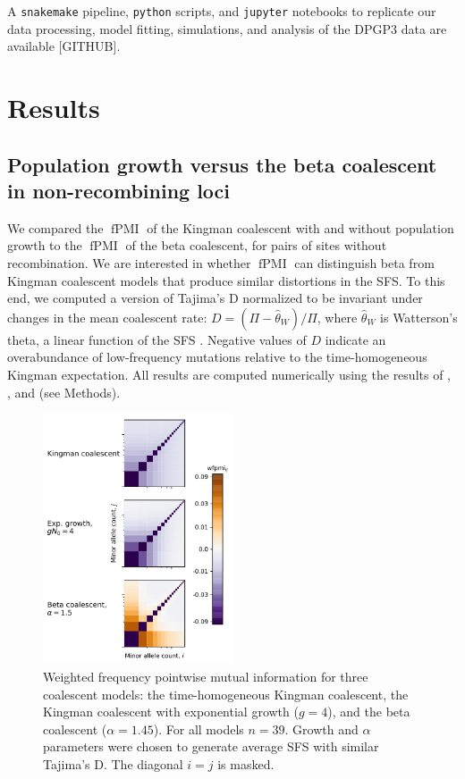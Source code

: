 \documentclass[11pt, letterpaper]{article}   	%
\DeclareMathOperator{\fpmi}{fPMI}
\begin{document}
A \texttt{snakemake} pipeline, \texttt{python} scripts, and \texttt{jupyter} notebooks to replicate our data processing, model fitting, simulations, and analysis of the DPGP3 data are available [GITHUB].

\section*{Results \label{sec:results}}

\subsection*{Population growth versus the beta coalescent in non-recombining loci}

We compared the $\fpmi$ of the Kingman coalescent with and without population growth to the $\fpmi$ of the beta coalescent, for pairs of sites without recombination.
We are interested in whether $\fpmi$ can distinguish beta from Kingman coalescent models that produce similar distortions in the SFS.
To this end, we computed a version of Tajima's D \autocite{Tajima1989} normalized to be invariant under changes in the mean coalescent rate: $D = (\Pi - \hat{\theta}_W) / \Pi$, where $\hat{\theta}_W$ is Watterson's theta, a linear function of the SFS \autocite{Watterson19??}.
Negative values of $D$ indicate an overabundance of low-frequency mutations relative to the time-homogeneous Kingman expectation.
All results are computed numerically using the results of \cite{Fu1995}, \cite{ZivkovicWiehe2008}, and \cite{BirknerEtAl2013} (see Methods).

\begin{figure}
\centering
\includegraphics[width=0.5\textwidth]{figures/wfpmi_no_recombination.pdf}
\caption{Weighted frequency pointwise mutual information for three coalescent models: the time-homogeneous Kingman coalescent, the Kingman coalescent with exponential growth ($g=4$), and the beta coalescent ($\alpha=1.45$). For all models $n=39$. Growth and $\alpha$ parameters were chosen to generate average SFS with similar Tajima's D. The diagonal $i=j$ is masked. \label{fig:nonrecombining_pmi}}
\end{figure}
\end{document}

